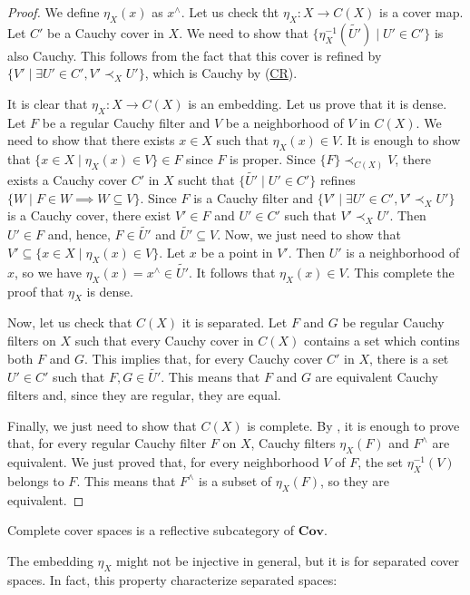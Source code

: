 \documentclass[reqno]{amsart}
\newcommand{\axref}[1]{(\hyperref[ax:#1]{#1})}
\theoremstyle{definition}
\theoremstyle{remark}
\numberwithin{figure}{section}
\newcommand{\rb}{\prec}
\newcommand{\cat}[1]{\mathbf{#1}}
\begin{document}
\begin{proof}
We define $\eta_X(x)$ as $x^\wedge$.
Let us check tht $\eta_X : X \to C(X)$ is a cover map.
Let $C'$ be a Cauchy cover in $X$.
We need to show that $\{ \eta_X^{-1}(\widetilde{U'}) \mid U' \in C' \}$ is also Cauchy.
This follows from the fact that this cover is refined by $\{ V' \mid \exists U' \in C', V' \rb_X U' \}$, which is Cauchy by \axref{CR}.

It is clear that $\eta_X : X \to C(X)$ is an embedding.
Let us prove that it is dense.
Let $F$ be a regular Cauchy filter and $V$ be a neighborhood of $V$ in $C(X)$.
We need to show that there exists $x \in X$ such that $\eta_X(x) \in V$.
It is enough to show that $\{ x \in X \mid \eta_X(x) \in V \} \in F$ since $F$ is proper.
Since $\{ F \} \rb_{C(X)} V$, there exists a Cauchy cover $C'$ in $X$ sucht that $\{ \widetilde{U'} \mid U' \in C' \}$ refines $\{ W \mid F \in W \implies W \subseteq V \}$.
Since $F$ is a Cauchy filter and $\{ V' \mid \exists U' \in C', V' \rb_X U' \}$ is a Cauchy cover, there exist $V' \in F$ and $U' \in C'$ such that $V' \rb_X U'$.
Then $U' \in F$ and, hence, $F \in \widetilde{U'}$ and $\widetilde{U'} \subseteq V$.
Now, we just need to show that $V' \subseteq \{ x \in X \mid \eta_X(x) \in V \}$.
Let $x$ be a point in $V'$.
Then $U'$ is a neighborhood of $x$, so we have $\eta_X(x) = x^\wedge \in \widetilde{U'}$.
It follows that $\eta_X(x) \in V$.
This complete the proof that $\eta_X$ is dense.

Now, let us check that $C(X)$ it is separated.
Let $F$ and $G$ be regular Cauchy filters on $X$ such that every Cauchy cover in $C(X)$ contains a set which contins both $F$ and $G$.
This implies that, for every Cauchy cover $C'$ in $X$, there is a set $U' \in C'$ such that $F,G \in \widetilde{U'}$.
This means that $F$ and $G$ are equivalent Cauchy filters and, since they are regular, they are equal.

Finally, we just need to show that $C(X)$ is complete.
By , it is enough to prove that, for every regular Cauchy filter $F$ on $X$, Cauchy filters $\eta_X(F)$ and $F^\wedge$ are equivalent.
We just proved that, for every neighborhood $V$ of $F$, the set $\eta_X^{-1}(V)$ belongs to $F$.
This means that $F^\wedge$ is a subset of $\eta_X(F)$, so they are equivalent.
\end{proof}

\begin{cor}
Complete cover spaces is a reflective subcategory of $\cat{Cov}$.
\end{cor}

The embedding $\eta_X$ might not be injective in general, but it is for separated cover spaces.
In fact, this property characterize separated spaces:
\end{document}
